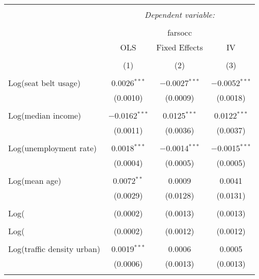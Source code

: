 
\begin{table}[!htbp] \centering 
  \caption{} 
  \label{} 
\begin{tabular}{@{\extracolsep{5pt}}lccc} 
\\[-1.8ex]\hline 
\hline \\[-1.8ex] 
 & \multicolumn{3}{c}{\textit{Dependent variable:}} \\ 
\cline{2-4} 
\\[-1.8ex] & \multicolumn{3}{c}{farsocc} \\ 
 & OLS & Fixed Effects & IV \\ 
\\[-1.8ex] & (1) & (2) & (3)\\ 
\hline \\[-1.8ex] 
 Log(seat belt usage) & 0.0026$^{***}$ & $-$0.0027$^{***}$ & $-$0.0052$^{***}$ \\ 
  & (0.0010) & (0.0009) & (0.0018) \\ 
  & & & \\ 
 Log(median income) & $-$0.0162$^{***}$ & 0.0125$^{***}$ & 0.0122$^{***}$ \\ 
  & (0.0011) & (0.0036) & (0.0037) \\ 
  & & & \\ 
 Log(unemployment rate) & 0.0018$^{***}$ & $-$0.0014$^{***}$ & $-$0.0015$^{***}$ \\ 
  & (0.0004) & (0.0005) & (0.0005) \\ 
  & & & \\ 
 Log(mean age) & 0.0072$^{**}$ & 0.0009 & 0.0041 \\ 
  & (0.0029) & (0.0128) & (0.0131) \\ 
  & & & \\ 
 Log(%
  & (0.0002) & (0.0013) & (0.0013) \\ 
  & & & \\ 
 Log(%
  & (0.0002) & (0.0012) & (0.0012) \\ 
  & & & \\ 
 Log(traffic density urban) & 0.0019$^{***}$ & 0.0006 & 0.0005 \\ 
  & (0.0006) & (0.0013) & (0.0013) \\ 
  & & & \\ 

\end{tabular}
\end{table}
